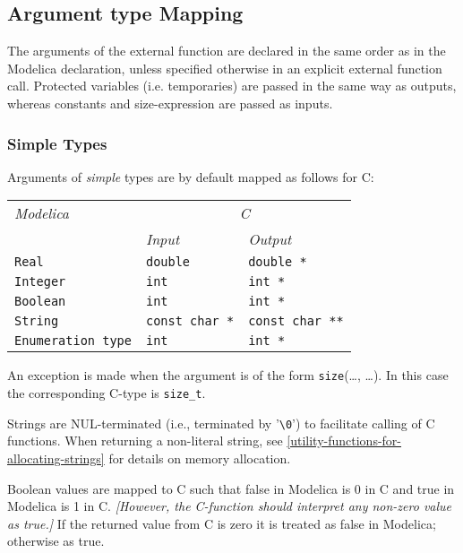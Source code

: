 \subsection{Argument type Mapping}

The arguments of the external function are declared in the same order as
in the Modelica declaration, unless specified otherwise in an explicit
external function call. Protected variables (i.e. temporaries) are
passed in the same way as outputs, whereas constants and size-expression
are passed as inputs.

\subsubsection{Simple Types}

Arguments of \emph{simple} types are by default mapped as follows for C:

\begin{longtable}[]{|l|l|l|}
\hline
\emph{Modelica} & \multicolumn{2}{c|}{\emph{C}}\\
& \emph{Input} & \emph{Output}\\ \hline
\endhead
\lstinline!Real! & \lstinline!double! & \lstinline!double *!\\ \hline
\lstinline!Integer! & \lstinline!int! & \lstinline!int *!\\ \hline
\lstinline!Boolean! & \lstinline!int! & \lstinline!int *!\\ \hline
\lstinline!String! & \lstinline!const char *! & \lstinline!const char **!\\ \hline
\lstinline!Enumeration type! & \lstinline!int! & \lstinline!int *!\\ \hline
\end{longtable}

An exception is made when the argument is of the form \lstinline!size!(\ldots{},
\ldots{}). In this case the corresponding C-type is \lstinline!size_t!.

Strings are NUL-terminated (i.e., terminated by '\lstinline!\0!') to
facilitate calling of C functions. When returning a non-literal string,
see \autoref{utility-functions-for-allocating-strings} for details on memory allocation.

Boolean values are mapped to C such that false in Modelica is 0 in C and
true in Modelica is 1 in C. \emph{{[}However, the C-function should
interpret any non-zero value as true.{]}} If the returned value from C
is zero it is treated as false in Modelica; otherwise as true.

